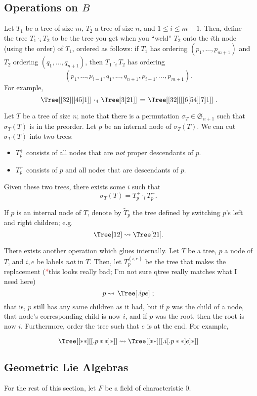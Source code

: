 \documentclass{article}
\newcommand{\tk}{\textcolor{red}{*}}
\newcommand{\Sym}{\mathfrak{S}}
\begin{document}
\subsection{Operations on $B$}
Let $T_1$ be a tree of size $m$, $T_2$ a tree of size $n$, and $1 \le i \le m+1$.  Then, define the tree $T_1 \cdot_i T_2$ to be the tree you get when you ``weld'' $T_2$ onto the $i$th node (using the order) of $T_1$, ordered as follows: if $T_1$ has ordering $(p_1,...,p_{m+1})$ and $T_2$ ordering $(q_1,...,q_{n+1})$, then $T_1 \cdot_i T_2$ has ordering
\[(p_1,...,p_{i-1},q_1,...,q_{n+1},p_{i+1},...,p_{m+1}). \]
For example,
\[ \left. \Tree[ [ 3 2 ] [ [ 4 5 ]  1 ] ] \right.  \cdot_4  \left. \Tree[ 3 [ 2 1 ] ] \right. = \left. \Tree[ [ 3 2 ] [ [ [ 6 [ 5 4 ] ] 7 ]  1 ] ] \right..
\]

Let $T$ be a tree of size $n$; note that there is a permutation $\sigma_T \in \Sym_{n+1}$ such that $\sigma_T(T)$ is in the preorder.  Let $p$ be an internal node of $\sigma_T(T)$.  We can cut $\sigma_T(T)$ into two trees:
\begin{itemize}
\item $T_p^+$ consists of all nodes that are \textit{not} proper descendants of $p$.
\item $T_p^-$ consists of $p$ and all nodes that are descendants of $p$.
\end{itemize}
Given these two trees, there exists some $i$ such that
\[\sigma_T(T) = T_p^+ \cdot_i T_p^-. \]

If $p$ is an internal node of $T$, denote by $\widetilde{T}_p$ the tree defined by switching $p$'s left and right children; e.g.
\[\Tree[ 1 2 ] \rightsquigarrow \Tree[ 2 1 ]. \]

There exists another operation which glues internally.  Let $T$ be a tree, $p$ a node of $T$, and $i,e$ be labels \textit{not} in $T$.  Then, let $T^{(i,e)}_p$ be the tree that makes the replacement (\tk this looks really bad; I'm not sure qtree really matches what I need here)
\[p \rightsquigarrow \left. \Tree [.i p e ] \right. ; \]
that is, $p$ still has any same children as it had, but if $p$ was the child of a node, that node's corresponding child is now $i$, and if $p$ was the root, then the root is now $i$.  Furthermore, order the tree such that $e$ is at the end.  For example,

\[\Tree [ [ * * ] [ [.p * * ] * ] ] \rightsquigarrow \Tree [ [ * * ] [ [.i [.p * * ] e ] * ] ] \]

\subsection{Geometric Lie Algebras}
For the rest of this section, let $F$ be a field of characteristic $0$.
\end{document}
